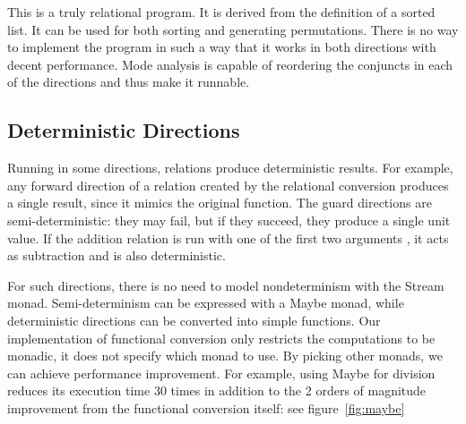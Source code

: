 This is a truly relational program.
It is derived from the definition of a sorted list.
It can be used for both sorting and generating permutations.
There is no way to implement the program in such a way that it works in both directions with decent performance.
Mode analysis is capable of reordering the conjuncts in each of the directions and thus make it runnable.


\subsection{Deterministic Directions}

Running in some directions, relations produce deterministic results.
For example, any forward direction of a relation created by the relational conversion produces a single result, since it mimics the original function.
The guard directions are semi-deterministic: they may fail, but if they succeed, they produce a single unit value.
If the addition relation is run with one of the first two arguments \outm, it acts as subtraction and is also deterministic.

For such directions, there is no need to model nondeterminism with the Stream monad.
Semi-determinism can be expressed with a Maybe monad, while deterministic directions can be converted into simple functions.
Our implementation of functional conversion only restricts the computations to be monadic, it does not specify which monad to use.
By picking other monads, we can achieve performance improvement.
For example, using Maybe for division reduces its execution time $30$ times in addition to the 2 orders of magnitude improvement from the functional conversion itself: see figure~\ref{fig:maybe}

